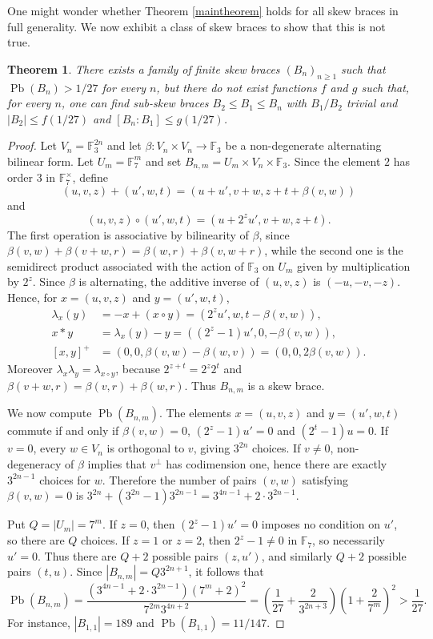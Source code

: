 \documentclass[11pt, oneside]{amsart}
\numberwithin{equation}{section}
\theoremstyle{plain}
\newtheorem{thm}[equation]{Theorem}
\theoremstyle{definition}
\newcommand{\Pb}{\operatorname{Pb} }
\begin{document}
One might wonder whether Theorem \ref{maintheorem} holds for all skew braces in full generality. We now exhibit a class of skew braces to show that this is not true. 


\begin{thm}
There exists a family of finite skew braces $(B_n)_{n\geqslant 1}$ such that $\Pb(B_n)>1/27$ for every $n$, but there do not exist functions $f$ and $g$ such that, for every $n$, one can find sub-skew braces $B_2\leqslant B_1\leqslant B_n$ with $B_1/B_2$ trivial and
$|B_2|\leqslant f(1/27)$ and $[B_n:B_1]\leqslant g(1/27)$.
\end{thm}
\begin{proof}
Let $V_n=\mathbb F_3^{2n}$ and let $\beta:V_n\times V_n\to\mathbb F_3$ be a non-degenerate alternating bilinear form. Let $U_m=\mathbb F_7^m$ and set $B_{n,m}=U_m\times V_n\times\mathbb F_3$. Since the element $2$ has order $3$ in $\mathbb F_7^\times$, define
$$
(u,v,z)+(u',w,t)=(u+u',v+w,z+t+\beta(v,w))$$
and 
$$
(u,v,z)\circ(u',w,t)=(u+2^zu',v+w,z+t).
$$
The first operation is associative by bilinearity of $\beta$, since
$\beta(v,w)+\beta(v+w,r)=\beta(w,r)+\beta(v,w+r)$, while the second one is the semidirect product associated with the action of $\mathbb F_3$ on $U_m$ given by multiplication by $2^z$. Since $\beta$ is alternating, the additive inverse of $(u,v,z)$ is $(-u,-v,-z)$. Hence, for $x=(u,v,z)$ and $y=(u',w,t)$,
$$
\begin{aligned}
\lambda_x(y)
&=-x+(x\circ y)
 =(2^zu',w,t-\beta(v,w)),\\
x*y
&=\lambda_x(y)-y
 =((2^z-1)u',0,-\beta(v,w)),\\
[x,y]^+
&=(0,0,\beta(v,w)-\beta(w,v))
 =(0,0,2\beta(v,w)).
\end{aligned}
$$
Moreover $\lambda_x\lambda_y=\lambda_{x\circ y}$, because
$2^{z+t}=2^z2^t$ and $\beta(v+w,r)=\beta(v,r)+\beta(w,r)$. Thus $B_{n,m}$ is a skew brace.

We now compute $\Pb(B_{n,m})$. The elements $x=(u,v,z)$ and $y=(u',w,t)$ commute if and only if
$\beta(v,w)=0$, $(2^z-1)u'=0$ and $(2^t-1)u=0$. If $v=0$, every $w\in V_n$ is orthogonal to $v$, giving $3^{2n}$ choices. If $v\neq0$, non-degeneracy of $\beta$ implies that $v^\perp$ has codimension one, hence there are exactly $3^{2n-1}$ choices for $w$. Therefore the number of pairs $(v,w)$ satisfying $\beta(v,w)=0$ is
$3^{2n}+(3^{2n}-1)3^{2n-1}=3^{4n-1}+2\cdot3^{2n-1}$.

Put $Q=|U_m|=7^m$. If $z=0$, then $(2^z-1)u'=0$ imposes no condition on $u'$, so there are $Q$ choices. If $z=1$ or $z=2$, then $2^z-1\neq0$ in $\mathbb F_7$, so necessarily $u'=0$. Thus there are $Q+2$ possible pairs $(z,u')$, and similarly $Q+2$ possible pairs $(t,u)$. Since $|B_{n,m}|=Q3^{2n+1}$, it follows that
$$
\Pb(B_{n,m})
=\frac{(3^{4n-1}+2\cdot3^{2n-1})(7^m+2)^2}
{7^{2m}3^{4n+2}}
=\left(\frac1{27}+\frac{2}{3^{2n+3}}\right)
\left(1+\frac{2}{7^m}\right)^2
>\frac1{27}.
$$
For instance, $|B_{1,1}|=189$ and $\Pb(B_{1,1})=11/147$.


\end{proof}
\end{document}
